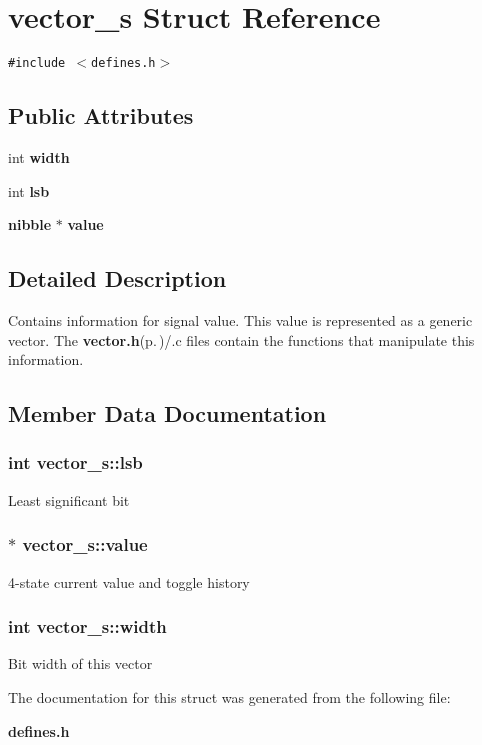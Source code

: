 \section{vector\_\-s Struct Reference}
\label{structvector__s}
{\tt \#include $<$defines.h$>$}

\subsection*{Public Attributes}
\begin{CompactItemize}
\item 
int {\bf width}
\item 
int {\bf lsb}
\item 
{\bf nibble} $\ast$ {\bf value}
\end{CompactItemize}


\subsection{Detailed Description}
Contains information for signal value. This value is represented as a generic vector. The {\bf vector.h}{\rm (p.\,\pageref{vector_8h})}/.c files contain the functions that manipulate this information. 



\subsection{Member Data Documentation}
\subsubsection{\setlength{\rightskip}{0pt plus 5cm}int {\bf vector\_\-s::lsb}}\label{structvector__s_o1}


Least significant bit 
\subsubsection{$\ast$ {\bf vector\_\-s::value}}\label{structvector__s_o2}


4-state current value and toggle history 
\subsubsection{\setlength{\rightskip}{0pt plus 5cm}int {\bf vector\_\-s::width}}\label{structvector__s_o0}


Bit width of this vector 

The documentation for this struct was generated from the following file:\begin{CompactItemize}
\item 
{\bf defines.h}\end{CompactItemize}
